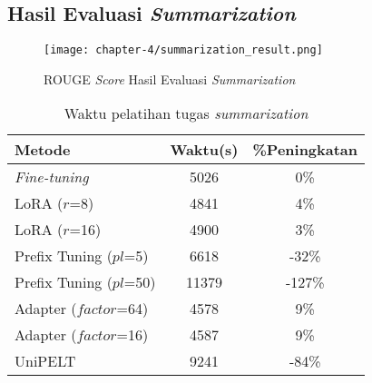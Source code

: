 \subsection{Hasil Evaluasi \textit{Summarization}}

\begin{figure}[h]
    \centering
    \centerline{\texttt{[image: chapter-4/summarization\_result.png]}}
    \caption{ROUGE \textit{Score} Hasil Evaluasi \textit{Summarization}}
    \label{fig:summarization-result}
\end{figure}

\begin{table}[h]
    \centering
    \caption{Waktu pelatihan tugas \textit{summarization}}
    \label{table:runtime-summarization}
    \begin{tabular}{l|cc}
        \toprule
        \textbf{Metode} & \textbf{Waktu(s)} & \textbf{\%Peningkatan} \\
        \midrule
        \textit{Fine-tuning} & 5026 & 0\% \\
        LoRA ($r$=8) & 4841 & 4\% \\
        LoRA ($r$=16) & 4900 & 3\% \\
        Prefix Tuning ($pl$=5) & 6618 & -32\% \\
        Prefix Tuning ($pl$=50) & 11379 & -127\% \\
        Adapter ($factor$=64) & 4578 & 9\% \\
        Adapter ($factor$=16) & 4587 & 9\% \\
        UniPELT & 9241 & -84\% \\
        \bottomrule
    \end{tabular}
\end{table}
